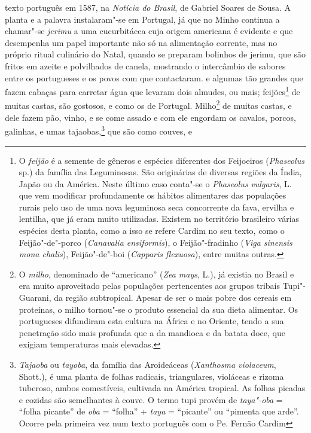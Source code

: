 \begin{linenumbers}
{texto português em 1587, na \textit{Notícia do Brasil}, de Gabriel
Soares de Sousa. A planta e a palavra instalaram"-se em Portugal, já que
no Minho continua a chamar"-se \textit{jerimu} a uma cucurbitácea cuja
origem americana é evidente e que desempenha um papel importante não só
na alimentação corrente, mas no próprio ritual culinário do Natal,
quando se preparam bolinhos de jerimu, que são fritos em azeite e
polvilhados de canela, mostrando o intercâmbio de sabores entre os
portugueses e os povos com que contactaram.} e algumas tão
grandes que fazem cabaças para carretar água que levaram dois almudes,
ou mais; feijões\footnote{ O \textit{feijão} é a semente de gêneros e
espécies diferentes dos Feijoeiros (\textit{Phaseolus} sp.) da família
das Leguminosas. São originárias de diversas regiões da Índia, Japão ou
da América. Neste último caso conta"-se o \textit{Phaseolus vulgaris}, 
L. que vem modificar profundamente os hábitos alimentares das
populações rurais pelo uso de uma nova leguminosa seca concorrente da
fava, ervilha e lentilha, que já eram muito utilizadas. Existem no
território brasileiro várias espécies desta planta, como a isso se
refere Cardim no seu texto, como o Feijão"-de"-porco (\textit{Canavalia
ensiformis}), o Feijão"-fradinho (\textit{Viga sinensis mona chalis}), 
Feijão"-de"-boi (\textit{Capparis flexuosa}), entre muitas outras.} de
muitas castas, são gostosos, e como os de Portugal. Milho\footnote{ O
\textit{milho}, denominado de ``americano'' (\textit{Zea mays}, L.), 
já existia no Brasil e era muito aproveitado pelas populações
pertencentes aos grupos tribais Tupi"-Guarani, da região subtropical.
Apesar de ser o mais pobre dos cereais em proteínas, o milho tornou"-se
o produto essencial da sua dieta alimentar. Os portugueses difundiram
esta cultura na África e no Oriente, tendo a sua penetração sido mais
profunda que a da mandioca e da batata doce, que exigiam temperaturas
mais elevadas.} de muitas castas, e dele fazem pão, vinho, e se come
assado e com ele engordam os cavalos, porcos, galinhas, e umas
tajaobas,\footnote{ \textit{Tajaoba} ou \textit{tayoba}, da família
das Aroideáceas (\textit{Xanthosma violaceum}, Shott.), é uma planta de
folhas radicais, triangulares, violáceas e rizoma tuberoso, ambos
comestíveis, cultivada na América tropical. As folhas picadas e
cozidas são semelhantes à couve. O termo tupi provém de
\textit{taya"-oba} = ``folha picante'' de \textit{oba} = ``folha'' +
\textit{taya} = ``picante'' ou ``pimenta que arde''. Ocorre pela primeira
vez num texto português com o Pe. Fernão Cardim} que são como couves, e

\end{linenumbers}
